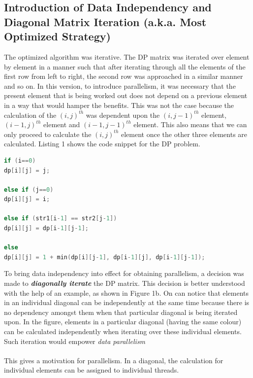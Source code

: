 \documentclass[a4paper,10pt,twoside]{article}
\begin{document}
\subsection{Introduction of Data Independency and Diagonal Matrix Iteration (a.k.a. Most Optimized Strategy)}
The optimized algorithm was iterative. The DP matrix was iterated over element by element in a manner such that after iterating through all the elements of the first row from left to right, the second row was approached in a similar manner and so on. In this version, to introduce parallelism, it was necessary that the present element that is being worked out does not depend on a previous element in a way that would hamper the benefits. This was not the case because the calculation of the $(i, j)^{th}$ was dependent upon the $(i, j-1)^{th}$ element, $(i-1, j)^{th}$ element and $(i-1, j-1)^{th}$ element. This also means that we can only proceed to calculate the $(i, j)^{th}$ element once the other three elements are calculated. Listing 1 shows the code snippet for the DP problem.\\
\begin{lstlisting}[language=c++, caption=Code Snippet For DP Version]
if (i==0) 
dp[i][j] = j;

else if (j==0) 
dp[i][j] = i; 

else if (str1[i-1] == str2[j-1]) 
dp[i][j] = dp[i-1][j-1]; 

else
dp[i][j] = 1 + min(dp[i][j-1], dp[i-1][j], dp[i-1][j-1]);
\end{lstlisting}
To bring data independency into effect for obtaining parallelism, a decision was made to \textbf{\textit{diagonally iterate}} the DP matrix. This decision is better understood with the help of an example, as shown in Figure 1b. On can notice that elements in an individual diagonal can be independently at the same time because there is no dependency amongst them when that particular diagonal is being iterated upon. In the figure, elements in a particular diagonal (having the same colour) can be calculated independently when iterating over these individual elements. Such iteration would empower \textit{data parallelism}\\ \\
This gives a motivation for parallelism. In a diagonal, the calculation for individual elements can be assigned to individual threads.
\end{document}

